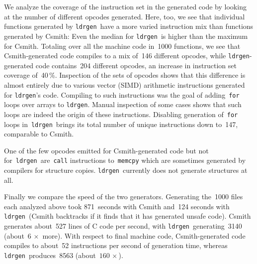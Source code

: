 \documentclass{llncs}
\newcommand\ldrgen{\texttt{ldrgen}}
\begin{document}
We analyze the coverage of the instruction set in the generated
code by looking at the number of different opcodes generated. Here, too, we
see that individual functions generated by \ldrgen\ have a more varied
instruction mix than functions generated by Csmith: Even the median for
\ldrgen\ is higher than the maximum for Csmith. Totaling over all the
machine code in~1000 functions, we see that Csmith-generated code compiles
to a mix of~146 different opcodes, while \ldrgen-generated code contains~204
different opcodes, an increase in instruction set coverage of~40\,\%.
Inspection of the sets of opcodes shows that this difference is almost
entirely due to various vector (SIMD) arithmetic instructions generated for
\ldrgen's code. Compiling to such instructions was the goal of
adding~\verb|for| loops over arrays to \ldrgen.  Manual inspection of some
cases shows that such loops are indeed the origin of these instructions.
Disabling generation of~\verb|for| loops in~\ldrgen\ brings its total number
of unique instructions down to~147, comparable to Csmith.

One of the few opcodes emitted for Csmith-generated code but not
for~\ldrgen\ are~\verb|call| instructions to~\verb|memcpy| which are
sometimes generated by compilers for structure copies. \ldrgen\ currently
does not generate structures at all.

Finally we compare the speed of the two generators. Generating the~1000
files each analyzed above took 871~seconds with Csmith and~124 seconds with
\ldrgen\ (Csmith backtracks if it finds that it has generated unsafe code).
Csmith generates about~527 lines of C code per second, with \ldrgen\
generating~3140 (about~\(6\,\times\) more). With respect to final machine
code, Csmith-generated code compiles to about~52 instructions per second of
generation time, whereas \ldrgen\ produces~8563 (about~\(160\,\times\)).



\end{document}
